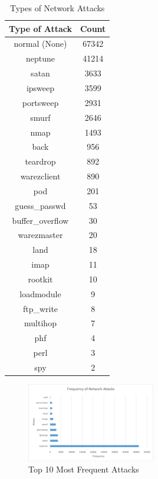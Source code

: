 \documentclass[conference]{IEEEtran}
\begin{document}
\begin{table}[htbp]
\caption{Types of Network Attacks}
\begin{center}
\begin{tabular}{|c|c|}
\hline
Type of Attack & Count \\
\hline
normal (None)	&	67342	\\
neptune	&	41214	\\
satan	&	3633	\\
ipsweep	&	3599	\\
portsweep	&	2931	\\
smurf	&	2646	\\
nmap	&	1493	\\
back	&	956	\\
teardrop	&	892	\\
warezclient	&	890	\\
pod	&	201	\\
guess\_passwd	&	53	\\
buffer\_overflow	&	30	\\
warezmaster	&	20	\\
land	&	18	\\
imap	&	11	\\
rootkit	&	10	\\
loadmodule	&	9	\\
ftp\_write	&	8	\\
multihop	&	7	\\
phf	&	4	\\
perl	&	3	\\
spy	&	2	\\
\hline
\end{tabular}
\label{tab1}
\end{center}
\end{table}

\begin{figure}[htbp]
\centerline{\includegraphics[height= 170 pt, width=0.50\textwidth]{External/Fig-Frequency-of-Attacks.PNG}}
\caption{Top 10 Most Frequent Attacks}
\label{fig1}
\end{figure}
\end{document}
